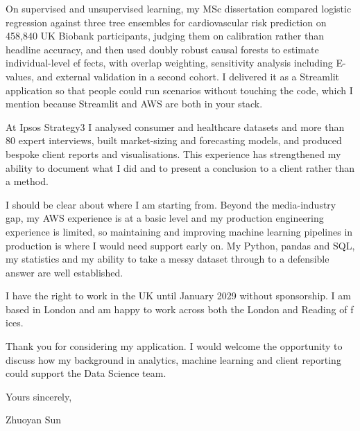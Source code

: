 \documentclass[letterpaper,11pt]{article}
\begin{document}
On supervised and unsupervised learning, my MSc dissertation compared logistic regression against three tree ensembles for cardiovascular risk prediction on 458,840 UK Biobank participants, judging them on calibration rather than headline accuracy, and then used doubly robust causal forests to estimate individual-level ef\kern0pt fects, with overlap weighting, sensitivity analysis including E-values, and external validation in a second cohort. I delivered it as a Streamlit application so that people could run scenarios without touching the code, which I mention because Streamlit and AWS are both in your stack.

At Ipsos Strategy3 I analysed consumer and healthcare datasets and more than 80 expert interviews, built market-sizing and forecasting models, and produced bespoke client reports and visualisations. This experience has strengthened my ability to document what I did and to present a conclusion to a client rather than a method.

I should be clear about where I am starting from. Beyond the media-industry gap, my AWS experience is at a basic level and my production engineering experience is limited, so maintaining and improving machine learning pipelines in production is where I would need support early on. My Python, pandas and SQL, my statistics and my ability to take a messy dataset through to a defensible answer are well established.

I have the right to work in the UK until January 2029 without sponsorship. I am based in London and am happy to work across both the London and Reading of\kern0pt f\kern0pt ices.

Thank you for considering my application. I would welcome the opportunity to discuss how my background in analytics, machine learning and client reporting could support the Data Science team.

\vspace{2pt}
Yours sincerely,

\vspace{8pt}
Zhuoyan Sun
\end{document}
